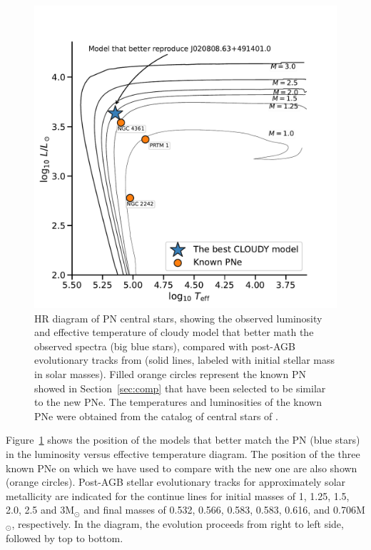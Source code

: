 \documentclass[fleqn,usenatbib]{mnras}
\begin{document}
\begin{figure}
\centering
  \includegraphics[width=\linewidth]{Figs/hr-planetarieNebula}
  \caption{HR diagram of PN central stars, showing the observed luminosity
    and effective temperature of {\sc cloudy} model that better math the observed spectra
    (big blue stars), compared with post-AGB evolutionary tracks from \citet{Miller:2016}
    (solid lines, labeled with initial stellar mass in solar masses). Filled orange circles
    represent the known PN showed in Section~\ref{sec:comp} that have been selected to
    be similar to the new PNe. The temperatures and luminosities of the known
    PNe were obtained from the catalog of central stars of \citet{Weidmann:2020}.} 
 \label{fig:track-evolutive}
\end{figure}

Figure~\ref{fig:track-evolutive} shows the position of the models that better match the PN
(blue stars) in the luminosity versus effective temperature diagram.
The position of the three known PNe on which we have used to compare with the new
one are also shown (orange circles). Post-AGB stellar evolutionary tracks
for approximately solar metallicity \citep{Miller:2016} are indicated for the continue
lines for initial masses of 1, 1.25, 1.5, 2.0, 2.5 and 3M$_{\odot}$ and final masses of
0.532, 0.566, 0.583, 0.583, 0.616, and 0.706M$_{\odot}$, respectively. In the diagram,
the evolution proceeds from right to left side, followed by top to bottom.
\end{document}
